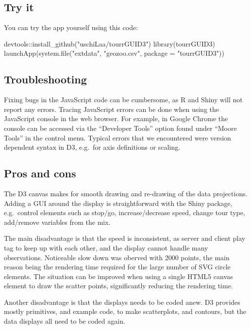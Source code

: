 \hypertarget{try-it}{%
\subsection{Try it}\label{try-it}}

You can try the app yourself using this code:

\begin{Schunk}
\begin{Sinput}
devtools::install_github("uschiLaa/tourrGUID3")
library(tourrGUID3)
launchApp(system.file("extdata", "geozoo.csv", package = "tourrGUID3"))
\end{Sinput}
\end{Schunk}

\hypertarget{troubleshooting}{%
\subsection{Troubleshooting}\label{troubleshooting}}

Fixing bugs in the JavaScript code can be cumbersome, as R and Shiny
will not report any errors. Tracing JavaScript errors can be done when
using the JavaScript console in the web browser. For example, in Google
Chrome the console can be accessed via the ``Developer Tools'' option
found under ``Moore Tools'' in the control menu. Typical errors that we
encountered were version dependent syntax in D3, e.g.~for axis
definitions or scaling.

\hypertarget{pros-and-cons}{%
\subsection{Pros and cons}\label{pros-and-cons}}

The D3 canvas makes for smooth drawing and re-drawing of the data
projections. Adding a GUI around the display is straightforward with the
Shiny package, e.g.~control elements such as stop/go, increase/decrease
speed, change tour type, add/remove variables from the mix.

The main disadvantage is that the speed is inconsistent, as server and
client play tag to keep up with each other, and the display cannot
handle many observations. Noticeable slow down was oberved with 2000
points, the main reason being the rendering time required for the large
number of SVG circle elements. The situation can be improved when using
a single HTML5 canvas element to draw the scatter points, significantly
reducing the rendering time.

Another disadvantage is that the displays needs to be coded anew. D3
provides mostly primitives, and example code, to make scatterplots, and
contours, but the data displays all need to be coded again.

